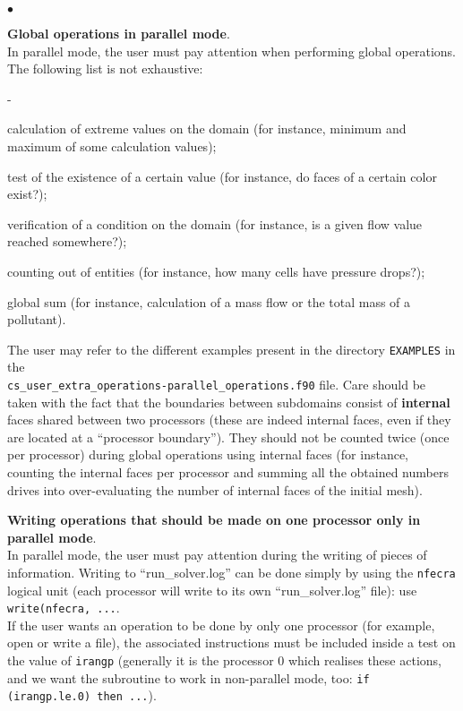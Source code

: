 {{{{\begin{list}{$\bullet$}{}
\item {\bf Global operations in parallel mode}.\\
In parallel mode, the user must pay attention when performing
      global operations. The following list is not exhaustive:
        \begin{list}{-}{}
\item calculation of extreme values on the domain (for instance, minimum
      and maximum of some calculation values);
\item test of the existence of a certain value (for instance, do faces
      of a certain color exist?);
\item verification of a condition on the domain (for instance, is a
      given flow value reached somewhere?);
\item counting out of entities (for instance, how many cells have
      pressure drops?);
\item global sum (for instance, calculation of a mass flow or the total
      mass of a pollutant).
      \end{list}
The user may refer to the different examples present in the directory \texttt{EXAMPLES} in the\\
\texttt{cs\_user\_extra\_operations-parallel\_operations.f90} file.
Care should be taken with the fact that the boundaries between
      subdomains consist of {\bf internal} faces shared between
      two processors (these are indeed internal faces, even if they are
      located at a ``processor boundary''). They should not be counted twice
      (once per processor) during global operations using internal faces
      (for instance, counting the internal faces per processor and
      summing all the obtained numbers drives into over-evaluating the
      number of internal faces of the initial mesh).

\item {\bf Writing operations that should be made on one
      processor only in parallel mode}.\\
In parallel mode, the user must pay attention during the writing of
      pieces of information. Writing to ``run\_solver.log'' can be done
      simply by using the \texttt{nfecra} logical unit (each processor will write
      to its own ``run\_solver.log'' file): use
      \texttt{write(nfecra, ...}. \\
If the user wants an operation to be done by only one processor (for
      example, open or write a file), the associated instructions must
      be included inside a test on the value of \texttt{irangp} (generally it is
      the processor 0 which realises these actions, and we want the
      subroutine to work in non-parallel mode, too: \texttt{if
      (irangp.le.0) then ...}).
\end{list}

}}}}
